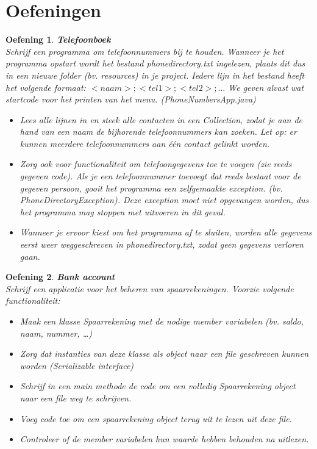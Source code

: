 \documentclass{tstextbook}
\newtheorem{envoefening}{Oefening}[chapter]
\newenvironment{oefening}
               {\begin{boxexercise}\begin{envoefening}}
               {\end{envoefening}\end{boxexercise}}
\begin{document}
\section{Oefeningen}

\begin{oefening}
\textbf{Telefoonboek}\\

Schrijf een programma om telefoonnummers bij te houden.
Wanneer je het programma opstart wordt het bestand phonedirectory.txt ingelezen,
plaats dit dus in een nieuwe folder (bv. resources) in je project. Iedere lijn in het
bestand heeft het volgende formaat: $<naam>;<tel1>;<tel2>;…$
We geven alvast wat startcode voor het printen van het menu.
(PhoneNumbersApp.java)
\begin{itemize}
\item Lees alle lijnen in en steek alle contacten in een Collection, zodat je aan de hand van
een naam de bijhorende telefoonnummers kan zoeken. Let op: er kunnen meerdere
telefoonnummers aan één contact gelinkt worden.
\item Zorg ook voor functionaliteit om telefoongegevens toe te voegen (zie reeds gegeven
code). Als je een telefoonnummer toevoegt dat reeds bestaat voor de gegeven
persoon, gooit het programma een zelfgemaakte exception. (bv.
PhoneDirectoryException). Deze exception moet niet opgevangen worden, dus het
programma mag stoppen met uitvoeren in dit geval.
\item Wanneer je ervoor kiest om het programma af te sluiten, worden alle gegevens eerst
weer weggeschreven in phonedirectory.txt, zodat geen gegevens verloren gaan.
\end{itemize}
\end{oefening}

\begin{oefening}
\textbf{Bank account}\\

Schrijf een applicatie voor het beheren van spaarrekeningen.
Voorzie volgende functionaliteit:
\begin{itemize}
\item Maak een klasse Spaarrekening met de nodige member variabelen (bv. saldo,
naam, nummer, …)
\item Zorg dat instanties van deze klasse als object naar een file geschreven kunnen
worden (Serializable interface)
\item Schrijf in een main methode de code om een volledig Spaarrekening object
naar een file weg te schrijven.
\item Voeg code toe om een spaarrekening object terug uit te lezen uit deze file.
\item Controleer of de member variabelen hun waarde hebben behouden na uitlezen.
\end{itemize}
\end{oefening}
\end{document}
